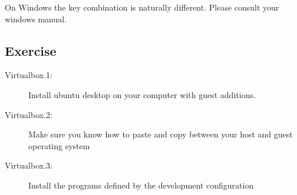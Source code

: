 On Windows the key combination is naturally different. Please consult
your windows manual.

\subsection{Exercise}\label{exercise}

\begin{description}
\item[Virtualbox.1:]
Install ubuntu desktop on your computer with guest additions.
\item[Virtualbox.2:]
Make sure you know how to paste and copy between your host and guest
operating system
\item[Virtualbox.3:]
Install the programs defined by the development configuration
\end{description}
